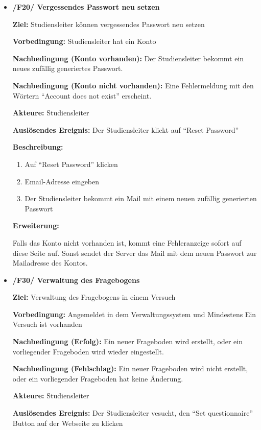 \documentclass[a4paper]{scrreprt}
\begin{document}
\begin{itemize}
                \item \textbf{/F20/ Vergessendes Passwort neu setzen}

                \par \textbf{Ziel: }\gls{Studiensleiter} können vergessendes Passwort neu setzen
                \par \textbf{Vorbedingung: }\gls{Studiensleiter} hat ein Konto
                \par \textbf{Nachbedingung (Konto vorhanden): }Der \gls{Studiensleiter} bekommt ein neues zufällig generiertes Passwort.
                \par \textbf{Nachbedingung (Konto nicht vorhanden): }Eine Fehlermeldung mit den Wörtern ``Account does not exist'' erscheint.
                \par \textbf{Akteure: }\gls{Studiensleiter}
                \par \textbf{Auslösendes Ereignis: }Der \gls{Studiensleiter} klickt auf ``Reset Password''
                \par \textbf{Beschreibung: }
                \begin{enumerate}
                    \item Auf ``Reset Password'' klicken
                    \item Email-Adresse eingeben
                    \item Der \gls{Studiensleiter} bekommt ein Mail mit einem neuen zufällig generierten Passwort 
                \end{enumerate}
                \par \textbf{Erweiterung: }
                    \par Falls das Konto nicht vorhanden ist, kommt eine Fehleranzeige sofort auf diese Seite auf. Sonst sendet der Server das Mail mit dem neuen Passwort zur Mailadresse des Kontos.


                \item \textbf{/F30/ Verwaltung des Fragebogens}

                \par \textbf{Ziel: }Verwaltung des Fragebogens in einem Versuch
                \par \textbf{Vorbedingung: }Angemeldet in dem Verwaltungssystem und Mindestens Ein Versuch ist vorhanden
                \par \textbf{Nachbedingung (Erfolg): }Ein neuer Frageboden wird erstellt, oder ein vorliegender Frageboden wird wieder eingestellt.
                \par \textbf{Nachbedingung (Fehlschlag): }Ein neuer Frageboden wird nicht erstellt, oder ein vorliegender Frageboden hat keine Änderung.
                \par \textbf{Akteure: }\gls{Studiensleiter}
                \par \textbf{Auslösendes Ereignis: }Der \gls{Studiensleiter} vesucht, den ``Set questionnaire'' Button auf der Webseite zu klicken


\end{itemize}
\end{document}
